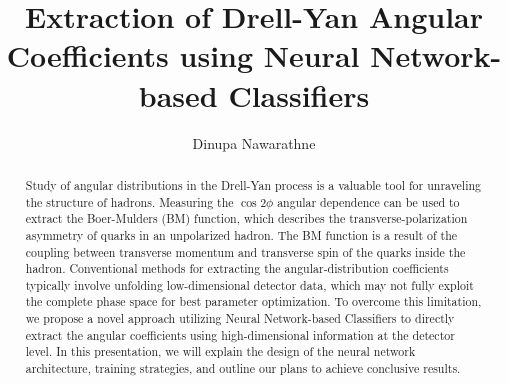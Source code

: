 \documentclass{article}
\title{Extraction of Drell-Yan Angular Coefficients using Neural Network-based Classifiers}
\author{Dinupa Nawarathne}
\begin{document}
\maketitle


%
%

\begin{abstract}
Study of angular distributions in the Drell-Yan process is a valuable
tool for unraveling the structure of hadrons. Measuring the $\cos2\phi$ angular
dependence can be used to extract the Boer-Mulders (BM) function, which
describes the transverse-polarization asymmetry of quarks in an
unpolarized hadron. The BM function is a result of the coupling between
transverse momentum and transverse spin of the quarks inside the hadron.
Conventional methods for extracting the angular-distribution coefficients
typically involve unfolding low-dimensional detector data, which may not fully exploit the
complete phase space for best parameter optimization. To overcome
this limitation, we propose a novel approach utilizing Neural Network-based
Classifiers to directly extract the angular coefficients using high-dimensional
information at the detector level. In this presentation,
we will explain the design of the neural network architecture, training
strategies, and outline our plans to achieve conclusive results.
\end{abstract}
\end{document}
